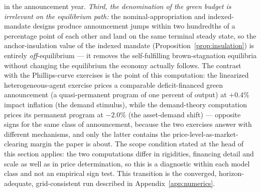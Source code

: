 \documentclass[12pt]{article}
\begin{document}
in the announcement year. \emph{Third, the denomination of the green
budget is irrelevant on the equilibrium path:} the nominal-appropriation
and indexed-mandate designs produce announcement jumps within two
hundredths of a percentage point of each other and land on the same
terminal steady state, so the anchor-insulation value of the indexed
mandate (Proposition~\ref{prop:insulation}) is entirely
\emph{off}-equilibrium --- it removes the self-fulfilling brown-stagnation
equilibria without changing the equilibrium the economy actually follows.
The contrast with the Phillips-curve exercises is the point of this
computation: the linearized heterogeneous-agent exercise prices a
comparable deficit-financed green announcement (a quasi-permanent program of
one percent of output) at $+0.4\%$ impact inflation (the demand stimulus),
while the demand-theory computation prices its permanent program at
$-2.0\%$ (the asset-demand shift) --- opposite signs for the same class of
announcement, because the
two exercises answer with different mechanisms, and only the latter
contains the price-level-as-market-clearing margin the paper is about.
The scope condition stated at the head of this section applies: the two
computations differ in rigidities, financing detail and scale as well as in
price determination, so this is a diagnostic within each model class and not
an empirical sign test. This transition is the converged, horizon-adequate,
grid-consistent run described in Appendix~\ref{app:numerics}.
\end{document}
